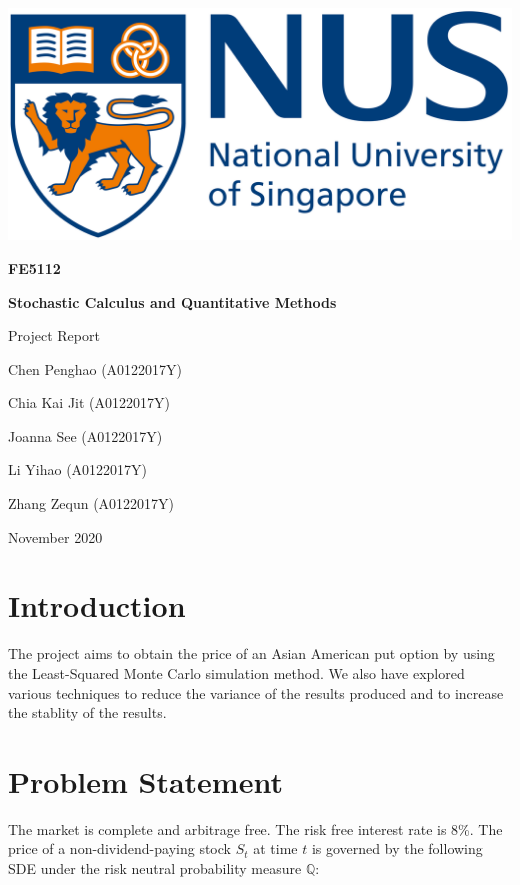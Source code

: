 \documentclass[12pt]{article}
\begin{document}
\begin{titlepage}
\centering
{
	\includegraphics[scale=0.08]{./media/0.png}\\
	\vfill
	{\Large \textbf{FE5112}\par}
	{\Large \textbf{Stochastic Calculus and Quantitative Methods}\par}
	{\Large Project Report\par}
	\vfill
	{\normalsize Chen Penghao (A0122017Y)\par}
	{\normalsize Chia Kai Jit (A0122017Y)\par}
	{\normalsize Joanna See (A0122017Y)\par}
	{\normalsize Li Yihao (A0122017Y)\par}
	{\normalsize Zhang Zequn (A0122017Y)\par}
	\vfill
	{ November 2020\par}
}
\end{titlepage}

\section{Introduction}
The project aims to obtain the price of an Asian American put option by using the Least-Squared Monte Carlo simulation method.  We also have explored various techniques to reduce the variance of the results produced and to increase the stablity of the results.

\section{Problem Statement}

The market is complete and arbitrage free. The risk free interest rate is 8\%. The price of a non-dividend-paying stock $S_t$ at time $t$ is governed by the following SDE under the risk neutral probability measure $\mathbb{Q}$:
\end{document}
